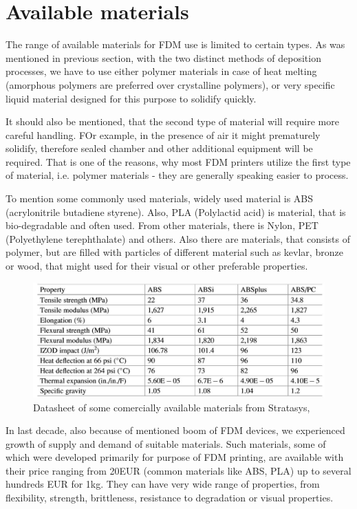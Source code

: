 \documentclass[a4paper, twoside, 11pt]{report}
\begin{document}
\section{Available materials}
The range of available materials for FDM use is limited to certain types. As was mentioned in previous section, with the two distinct methods of deposition processes, we have to use either polymer materials in case of heat melting (amorphous polymers are preferred over crystalline polymers), or very specific liquid material designed for this purpose to solidify quickly.

	It should also be mentioned, that the second type of material will require more careful handling. FOr example, in the presence of air it might prematurely solidify, therefore sealed chamber and other additional equipment will be required. That is one of the reasons, why most FDM printers utilize the first type of material, i.e. polymer materials - they are generally speaking easier to process.
	
	To mention some commonly used materials, widely used material is ABS (acrylonitrile butadiene styrene). Also, PLA (Polylactid acid) is material, that is bio-degradable and often used. From other materials, there is Nylon, PET (Polyethylene terephthalate) and others. Also there are materials, that consists of polymer, but are filled with particles of different material such as kevlar, bronze or wood, that might used  for their visual or other preferable properties.
\begin{figure}[h]
	\centering
	\includegraphics[scale=0.7]{datasheetFDM}
	\caption{Datasheet of some comercially available materials from Stratasys, \cite[p. 163]{AMT}}
\end{figure}
	In last decade, also because of mentioned boom of FDM devices, we experienced growth of supply and demand of suitable materials. Such materials, some of which were developed primarily for purpose of FDM printing, are available with their price ranging from 20EUR (common materials like ABS, PLA) up to several hundreds EUR for 1kg. They can have very wide range of properties, from flexibility, strength, brittleness, resistance to degradation or visual properties.
	
\end{document}
